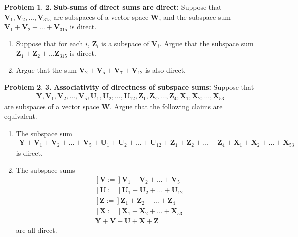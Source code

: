\documentclass{article}
\theoremstyle{definition}
\newtheorem*{prob*}{Problem}
\newcommand{\V}{\mathbf{V}}
\newcommand{\W}{\mathbf{W}}
\newcommand{\Z}{\mathbf{Z}}
\newcommand{\Y}{\mathbf{Y}}
\newcommand{\U}{\mathbf{U}}
\newcommand{\X}{\mathbf{X}}
\begin{document}
\newpage

\begin{prob*} \textbf{2.} \textbf{Sub-sums of direct sums are direct: }
	Suppose that $\V_1, \V_2,\dots, \V_{315}$ are subspaces of a vector space $\W$, and the subspace sum $\V_1+\V_2+\dots+\V_{315}$ is direct.
	\begin{enumerate}
		\item Suppose that for each $i$, $\Z_i$ is a subspace of $\V_i$. Argue that the subspace sum $\Z_1 + \Z_2 + \dots \Z_{315}$ is direct. 
		\item Argue that the sum $\V_2 + \V_5 + \V_7 + \V_{12}$ is also direct. 
	\end{enumerate}

\end{prob*}


\newpage


\begin{prob*} \textbf{3.} \textbf{Associativity of directness of subspace sums:} Suppose that 
	\begin{align*}
	\Y, \V_1, \V_2, \dots, \V_5, \U_1, \U_2, \dots, \U_{12},\Z_1,\Z_2,\dots,\Z_4, \X_1, \X_2, \dots,\X_{53}
	\end{align*}
	are subspaces of a vector space $\W$. Argue that the following claims are equivalent. 
	\begin{enumerate}
		\item The subspace sum 
		\begin{align*}
		\Y+ \V_1+ \V_2+\dots+ \V_5+ \U_1+ \U_2+ \dots+ \U_{12}+\Z_1+\Z_2+\dots+\Z_4+ \X_1+ \X_2+ \dots+\X_{53}
		\end{align*}
		is direct. 
		\item The subspace sums
		\begin{align*}
		&\left[\V :=  \right] \V_1 +\V_2 + \dots + \V_5\\
		&\left[\U :=  \right] \U_1 +\U_2 + \dots + \U_{12}\\
		&\left[\Z :=  \right] \Z_1 +\Z_2 + \dots + \Z_4\\
		&\left[\X :=  \right] \X_1 +\X_2 + \dots + \X_{53}\\
		&\Y + \V + \U + \X + \Z
		\end{align*}
		are all direct. 
	\end{enumerate}

\end{prob*}


\newpage
\end{document}
